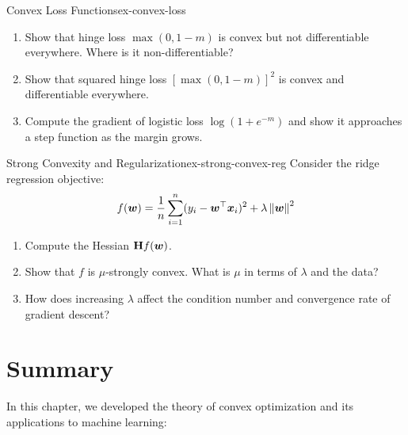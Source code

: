 \documentclass[../../main.tex]{subfiles}
\begin{document}
\begin{exercise}{Convex Loss Functions}{ex-convex-loss}
\begin{enumerate}[label=(\alph*)]
    \item Show that hinge loss $\max(0, 1 - m)$ is convex but not differentiable everywhere. Where is it non-differentiable?
    \item Show that squared hinge loss $[\max(0, 1-m)]^2$ is convex and differentiable everywhere.
    \item Compute the gradient of logistic loss $\log(1 + e^{-m})$ and show it approaches a step function as the margin grows.
\end{enumerate}
\end{exercise}

\begin{exercise}{Strong Convexity and Regularization}{ex-strong-convex-reg}
Consider the ridge regression objective:
\[
    f(\boldsymbol{w}) = \frac{1}{n}\sum_{i=1}^n (y_i - \boldsymbol{w}^\top \boldsymbol{x}_i)^2 + \lambda \left\lVert \boldsymbol{w} \right\rVert^2
\]
\begin{enumerate}[label=(\alph*)]
    \item Compute the Hessian $\mathbf{H} f(\boldsymbol{w})$.
    \item Show that $f$ is $\mu$-strongly convex. What is $\mu$ in terms of $\lambda$ and the data?
    \item How does increasing $\lambda$ affect the condition number and convergence rate of gradient descent?
\end{enumerate}
\end{exercise}

\section{Summary}
\label{sec:convex-summary}

In this chapter, we developed the theory of convex optimization and its applications to machine learning:
\end{document}
